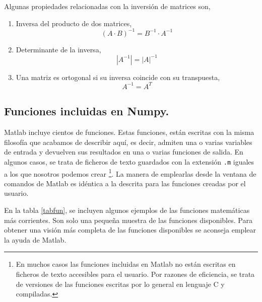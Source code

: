 Algunas propiedades relacionadas con la inversión de matrices son,
\begin{enumerate}
\item Inversa del producto de dos matrices,
\begin{equation*}
(A\cdot B)^{-1}=B^{-1}\cdot A^{-1}
\end{equation*}

\item Determinante de la inversa,
\begin{equation*}
\left\vert A^{-1} \right\vert = \vert A \vert ^{-1}
\end{equation*}

\item Una matriz es ortogonal si su inversa coincide con su transpuesta,
\begin{equation*}
A^{-1}=A^T
\end{equation*}
\end{enumerate}
\subsection{Funciones incluidas en Numpy.} 
Matlab incluye cientos de funciones. Estas funciones, están escritas con la misma filosofía que acabamos de describir aquí, es decir, admiten una o varias variables de entrada y devuelven sus resultados en una o varias funciones de salida. En algunos casos, se trata de ficheros de texto  guardados con la extensión \texttt{.m} iguales a los que nosotros podemos crear \footnote{En muchos casos las funciones incluidas en Matlab no están escritas en ficheros de texto accesibles para el usuario. Por razones de eficiencia, se trata de versiones de las funciones escritas por lo general en lenguaje C y compiladas.}. La manera de emplearlas desde la ventana de comandos de Matlab es idéntica a la descrita para las funciones creadas por el usuario. 

En la tabla \ref{tabfun}, se incluyen algunos ejemplos de las funciones matemáticas más corrientes. Son solo una pequeña muestra de las funciones disponibles. Para obtener una visión más completa de las funciones disponibles se aconseja emplear la ayuda de Matlab.

